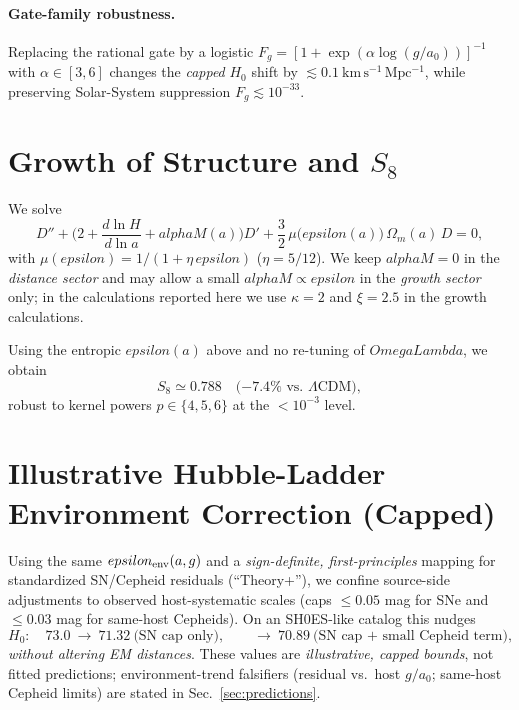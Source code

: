 \documentclass[aps,prd,onecolumn,superscriptaddress,nofootinbib]{revtex4-2}
\def\OmL{OmegaLambda}%
\def\alphaM{alphaM}%
\def\eps{epsilon}%
\newcommand{\OmL}{\Omega_\Lambda}
\newcommand{\alphaM}{\alpha_M}
\newcommand{\eps}{\varepsilon}
\begin{document}
\paragraph*{Gate-family robustness.}
Replacing the rational gate by a logistic \(F_g=[1+\exp(\alpha\log(g/a_0))]^{-1}\) with \(\alpha\in[3,6]\) changes the \emph{capped} $H_0$ shift by $\lesssim 0.1\ \mathrm{km\,s^{-1}\,Mpc^{-1}}$, while preserving Solar-System suppression \(F_g\lesssim 10^{-33}\).

\section{Growth of Structure and \texorpdfstring{$S_8$}{S8}}
\label{sec:growth}
We solve
\begin{equation}
D''+\Big(2+\frac{d\ln H}{d\ln a}+\alphaM(a)\Big)D' + \frac{3}{2}\,\mu\big(\eps(a)\big)\,\Omega_m(a)\,D=0,
\end{equation}
with $\mu(\eps)=1/(1+\eta\,\eps)$ ($\eta=5/12$). We keep $\alphaM=0$ in the \emph{distance sector} and may allow a small $\alphaM\propto \eps$ in the \emph{growth sector} only; in the calculations reported here we use $\kappa=2$ and $\xi=2.5$ in the growth calculations.

Using the entropic $\eps(a)$ above and no re-tuning of $\OmL$, we obtain
\begin{equation}
S_8\simeq 0.788\quad \text{($-7.4\%$ vs.\ $\Lambda$CDM)},
\end{equation}
robust to kernel powers $p\in\{4,5,6\}$ at the $<10^{-3}$ level.

\section{Illustrative Hubble-Ladder Environment Correction (Capped)}
\label{sec:h0-illustration}
Using the same $\eps_{\rm env}(a,g)$ and a \emph{sign-definite, first-principles} mapping for standardized SN/Cepheid residuals (``Theory+''), we confine source-side adjustments to observed host-systematic scales (caps $\le 0.05$ mag for SNe and $\le 0.03$ mag for same-host Cepheids). On an SH0ES-like catalog this nudges
\begin{equation}
H_0:\quad 73.0 \ \to\ 71.32\ \text{(SN cap only)},\qquad \to\ 70.89\ \text{(SN cap + small Cepheid term)},
\end{equation}
\emph{without altering EM distances}. These values are \emph{illustrative, capped bounds}, not fitted predictions; environment-trend falsifiers (residual vs.\ host $g/a_0$; same-host Cepheid limits) are stated in Sec.~\ref{sec:predictions}.
\end{document}
